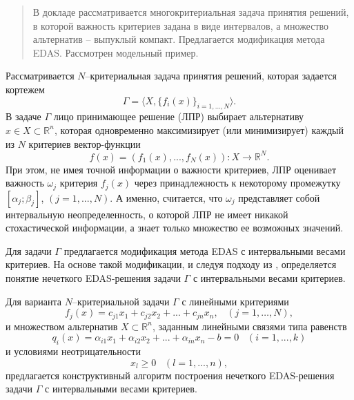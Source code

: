 
\maketitle

\begin{abstract}
В докладе рассматривается многокритериальная задача принятия решений, в которой важность критериев задана в виде интервалов, а множество альтернатив -- выпуклый компакт. Предлагается модификация метода EDAS. Рассмотрен модельный пример. 


\end{abstract}


Рассматривается $N$–критериальная задача принятия решений, которая задается кортежем
\begin{equation*}
	\varGamma=\langle X, \{f_{i}(x)\}_{i=1,...,N} \rangle .
\end{equation*}
В задаче $\varGamma$ лицо принимающее решение (ЛПР) выбирает альтернативу $x \in X \subset \mathbb{R}^{n}$, которая одновременно максимизирует (или минимизирует) каждый из $N$ критериев вектор-функции
$$
f(x)=(f_{1}(x), ..., f_{N}(x)) :X \rightarrow \mathbb{R}^{N}.
$$
При этом, не имея точной информации о важности критериев, ЛПР оценивает важность $\omega_{j}$ критерия $f_{j}(x)$ через принадлежность к некоторому промежутку $[\alpha_{j};\beta_{j}]$, $(j=1, ..., N)$. А именно, считается, что $\omega_{j}$ представляет собой интервальную неопределенность, о которой ЛПР не имеет никакой стохастической информации, а знает только множество ее возможных значений.


Для задачи $\varGamma$ предлагается модификация метода EDAS \cite{Ghorabaee} с интервальными весами критериев. На основе такой модификации, и следуя подходу из \cite{Uh}, 
определяется понятие нечеткого EDAS-решения задачи $\varGamma$ с интервальными весами критериев. 

Для варианта $N$–критериальной задачи $\varGamma$ с линейными критериями
\begin{equation}
	f_{j}(x)=c_{j1}x_{1}+c_{j2}x_{2}+ ... + c_{jn}x_{n}, \;\;\; (j = 1, \ldots , N),
\end{equation} 
и множеством альтернатив $X \subset \mathbb{R}^{n}$, заданным линейными связями типа равенств
\begin{equation}
	q_{i}(x)=\alpha_{i1}x_{1} + \alpha_{i2}x_{2} + ... + \alpha_{in}x_{n}-b=0 \;\;\; (i=1, ..., k)
\end{equation} 
и условиями неотрицательности
$$
	x_{l} \geq 0 \;\;\; (l = 1, ..., n),
$$
предлагается конструктивный алгоритм построения нечеткого EDAS-решения задачи $\varGamma$ с
интервальными весами критериев. 

